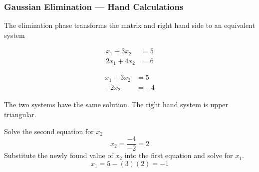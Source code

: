 \documentclass[10pt]{beamer}
\begin{document}
\begin{frame}
\frametitle{Gaussian Elimination --- Hand Calculations}

The elimination phase transforms the matrix and right
hand side to an equivalent system
\begin{center}
\begin{minipage}[b]{0.4\textwidth}
\begin{align*}
      x_1 + 3x_2 &= 5\\
    2 x_1 + 4x_2 &= 6
\end{align*}
\end{minipage}
\begin{minipage}[c]{0.1\textwidth}
\raisebox{5ex}{$\longrightarrow$}
\end{minipage}
\begin{minipage}[b]{0.4\textwidth}
\begin{align*}
      x_1 + 3x_2 &= 5\\
          - 2x_2 &= -4
\end{align*}
\end{minipage}
\end{center}
The two systems have the same solution.  The right hand
system is upper triangular.

Solve the second equation for $x_2$
\begin{equation*}
    x_2 = \frac{-4}{-2} = 2
\end{equation*}
Substitute the newly found value of $x_2$ into the
first equation and solve for $x_1$.
\begin{equation*}
    x_1 = 5 - (3)(2) = -1
\end{equation*}

\end{frame}
\end{document}
